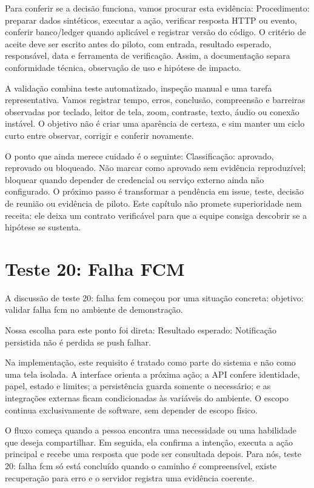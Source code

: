 \documentclass[12pt,oneside,a4paper,article]{abntex2}
\begin{document}
Para conferir se a decisão funciona, vamos procurar esta evidência: Procedimento: preparar dados sintéticos, executar a ação, verificar resposta HTTP ou evento, conferir banco/ledger quando aplicável e registrar versão do código. O critério de aceite deve ser escrito antes do piloto, com entrada, resultado esperado, responsável, data e ferramenta de verificação. Assim, a documentação separa conformidade técnica, observação de uso e hipótese de impacto.

A validação combina teste automatizado, inspeção manual e uma tarefa representativa. Vamos registrar tempo, erros, conclusão, compreensão e barreiras observadas por teclado, leitor de tela, zoom, contraste, texto, áudio ou conexão instável. O objetivo não é criar uma aparência de certeza, e sim manter um ciclo curto entre observar, corrigir e conferir novamente.

O ponto que ainda merece cuidado é o seguinte: Classificação: aprovado, reprovado ou bloqueado. Não marcar como aprovado sem evidência reproduzível; bloquear quando depender de credencial ou serviço externo ainda não configurado. O próximo passo é transformar a pendência em issue, teste, decisão de reunião ou evidência de piloto. Este capítulo não promete superioridade nem receita: ele deixa um contrato verificável para que a equipe consiga descobrir se a hipótese se sustenta.

\section{Teste 20: Falha FCM}
A discussão de teste 20: falha fcm começou por uma situação concreta: objetivo: validar falha fcm no ambiente de demonstração.

Nossa escolha para este ponto foi direta: Resultado esperado: Notificação persistida não é perdida se push falhar.

Na implementação, este requisito é tratado como parte do sistema e não como uma tela isolada. A interface orienta a próxima ação; a API confere identidade, papel, estado e limites; a persistência guarda somente o necessário; e as integrações externas ficam condicionadas às variáveis do ambiente. O escopo continua exclusivamente de software, sem depender de escopo físico.

O fluxo começa quando a pessoa encontra uma necessidade ou uma habilidade que deseja compartilhar. Em seguida, ela confirma a intenção, executa a ação principal e recebe uma resposta que pode ser consultada depois. Para nós, teste 20: falha fcm só está concluído quando o caminho é compreensível, existe recuperação para erro e o servidor registra uma evidência coerente.
\end{document}
